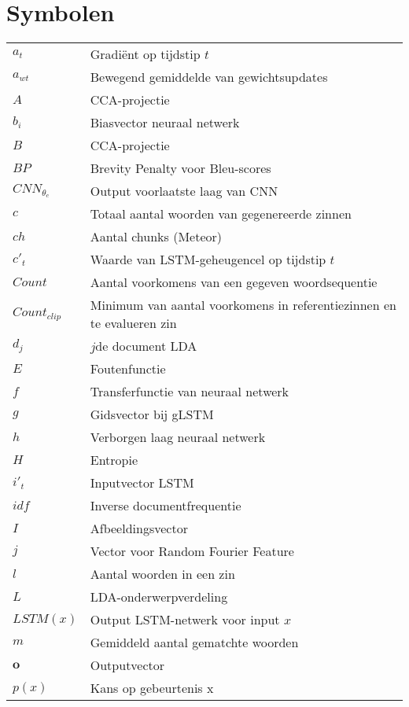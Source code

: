 \documentclass[master=cws,masteroption=ai]{kulemt}
\begin{document}
\section*{Symbolen}
\begin{flushleft}
  \renewcommand{\arraystretch}{1.1}
  \begin{tabularx}{\textwidth}{@{}p{25mm}X@{}}
  	$a_t$ & Gradi\"ent op tijdstip $t$\\
  	$a_{wt}$ & Bewegend gemiddelde van gewichtsupdates \\ 
  	$A$ & CCA-projectie\\
  	$b_i$ & Biasvector neuraal netwerk \\
  	$B$ & CCA-projectie\\
  	$BP$& Brevity Penalty voor Bleu-scores \\
  	$CNN_{\theta_c}$ & Output voorlaatste laag van CNN \\
  	$c$& Totaal aantal woorden van gegenereerde zinnen \\
  	$ch$ & Aantal chunks (Meteor) \\
  	$c'_t$ &Waarde van LSTM-geheugencel op tijdstip $t$ \\
  	$Count$ & Aantal voorkomens van een gegeven woordsequentie \\
  	$Count_{clip}$ & Minimum van aantal voorkomens in referentiezinnen en te evalueren zin \\
  	$d_j$ & $j$de document LDA \\
  	$E$ & Foutenfunctie\\
  	$f$ & Transferfunctie van neuraal netwerk\\
  	$g$ & Gidsvector bij gLSTM \\
  	$h$ & Verborgen laag neuraal netwerk\\
	$H$ & Entropie\\
	$i'_t$ & Inputvector LSTM \\
	$idf$ &Inverse documentfrequentie \\
	$I$& Afbeeldingsvector \\
	$j$ & Vector voor Random Fourier Feature \\
	$l$ & Aantal woorden in een zin \\
	$L$ & LDA-onderwerpverdeling \\
	$LSTM(x)$& Output LSTM-netwerk voor input $x$ \\
	$m$ & Gemiddeld aantal gematchte woorden \\
	$\textbf{o}$ & Outputvector\\
	$p(x)$ & Kans op gebeurtenis x\\

\end{tabularx}
\end{flushleft}
\end{document}
